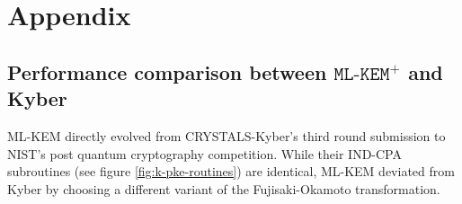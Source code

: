 \documentclass[journal=tches,submission]{iacrtrans}
\begin{document}



\section{Appendix}\label{sec:appendix}
\subsection{Performance comparison between $\texttt{ML-KEM}^+$ and Kyber}\label{sec:ml-kem-and-kyber}
ML-KEM directly evolved from CRYSTALS-Kyber's third round submission to NIST's post quantum cryptography competition. While their IND-CPA subroutines (see figure \ref{fig:k-pke-routines}) are identical, ML-KEM deviated from Kyber by choosing a different variant of the Fujisaki-Okamoto transformation.
\end{document}
